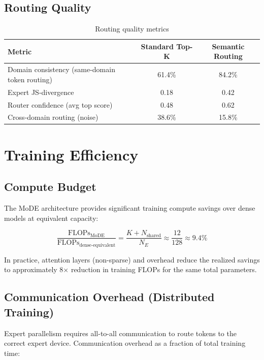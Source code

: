 \documentclass[11pt,a4paper]{article}
\begin{document}
\subsection{Routing Quality}

\begin{table}[H]
\centering
\caption{Routing quality metrics}
\label{tab:routing}
\begin{tabular}{lcc}
\toprule
Metric & Standard Top-K & Semantic Routing \\
\midrule
Domain consistency (same-domain token routing) & 61.4\% & 84.2\% \\
Expert JS-divergence & 0.18 & 0.42 \\
Router confidence (avg top score) & 0.48 & 0.62 \\
Cross-domain routing (noise) & 38.6\% & 15.8\% \\
\bottomrule
\end{tabular}
\end{table}

\section{Training Efficiency}

\subsection{Compute Budget}

The MoDE architecture provides significant training compute savings over dense models at equivalent capacity:

\begin{equation}
\frac{\text{FLOPs}_{\text{MoDE}}}{\text{FLOPs}_{\text{dense-equivalent}}} = \frac{K + N_{\text{shared}}}{N_E} \approx \frac{12}{128} \approx 9.4\%
\end{equation}

In practice, attention layers (non-sparse) and overhead reduce the realized savings to approximately 8$\times$ reduction in training FLOPs for the same total parameters.

\subsection{Communication Overhead (Distributed Training)}

Expert parallelism requires all-to-all communication to route tokens to the correct expert device. Communication overhead as a fraction of total training time:
\end{document}
